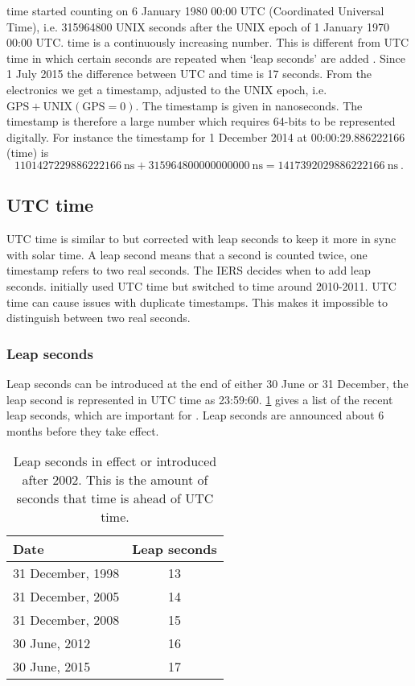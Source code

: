 \gps time started counting on 6 January 1980 00:00 UTC (Coordinated
Universal Time), i.e. \num{315964800} UNIX seconds after the UNIX epoch
of 1 January 1970 00:00 UTC. \gps time is a continuously increasing
number. This is different from UTC time in which certain seconds are
repeated when `leap seconds' are added \cite{usno:2012aa}. Since 1
July 2015 the difference between UTC and \gps time is 17 seconds.
From the \hisparc electronics we get a \gps timestamp, adjusted to the
UNIX epoch, i.e. $\mathrm{GPS} + \mathrm{UNIX(GPS=0)}$. The timestamp is
given in nanoseconds. The \gps timestamp is therefore a large number
which requires 64-bits to be represented digitally. For instance the
\gps timestamp for 1 December 2014 at 00:00:29.886222166 (\gps time) is
%
\begin{equation}
    \SI{1101427229886222166}{\nano\second} +
        \SI{315964800000000000}{\nano\second} =
        \SI{1417392029886222166}{\nano\second} \ .
\end{equation}


\subsection{UTC time}

UTC time is similar to \gps but corrected with leap seconds to keep it more in
sync with solar time. A leap second means that a second is counted twice, one
timestamp refers to two real seconds. The IERS decides when to add leap
seconds. \hisparc initially used UTC time but switched to \gps time around
2010-2011. UTC time can cause issues with duplicate timestamps. This makes it
impossible to distinguish between two real seconds.


\subsubsection{Leap seconds}

Leap seconds can be introduced at the end of either 30 June or 31
December, the leap second is represented in UTC time as 23:59:60.
\cref{table:leapseconds} gives a list of the recent leap seconds,
which are important for \hisparc. Leap seconds are announced about 6
months before they take effect.

\begin{table}
    \centering
    \begin{tabular}{ l c }
        \toprule
        Date & Leap seconds \\
        \midrule
        31 December, 1998 & 13 \\
        31 December, 2005 & 14 \\
        31 December, 2008 & 15 \\
        30 June, 2012 & 16 \\
        30 June, 2015 & 17 \\
        \bottomrule
    \end{tabular}
   \caption{Leap seconds in effect or introduced after 2002. This is the
            amount of seconds that \gps time is ahead of UTC time.}
   \label{table:leapseconds}
\end{table}


